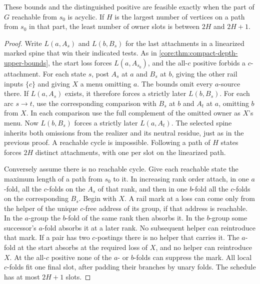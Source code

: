 \begin{theorem}
\label{core:thm:guard-transition-depth}
These bounds and the distinguished positive are feasible exactly when
the part of $G$ reachable from $s_0$ is acyclic. If $H$ is the largest
number of vertices on a path from $s_0$ in that part, the least number
of owner slots is between $2H$ and $2H+1$.
\end{theorem}
\begin{proof}
Write $L(a,A_s)$ and $L(b,B_s)$ for the last attachments in a
linearized marked spine that win their indicated tests. As in
\cref{core:thm:compact-depth-upper-bounds}, the start loss forces
$L(a,A_{s_0})$, and the all-$c$ positive forbids a $c$-attachment.
For each state $s$, post $A_s$ at $a$ and $B_s$ at $b$, giving
the other rail inputs $\{c\}$ and giving $X$ a menu omitting $a$.
The bounds omit every $a$-source there. If $L(a,A_s)$ exists, it
therefore forces a strictly later $L(b,B_s)$. For each arc $s\to t$,
use the corresponding comparison with $B_s$ at $b$ and $A_t$ at $a$,
omitting $b$ from $X$. In each comparison use the full complement
of the omitted owner as $X$'s menu. Now $L(b,B_s)$ forces a strictly later
$L(a,A_t)$. The selected spine inherits both omissions from the
realizer and its neutral residue, just as in the previous proof.
A reachable cycle is impossible. Following a path of $H$ states
forces $2H$ distinct attachments, with one per slot on the
linearized path.

Conversely assume there is no reachable cycle. Give each reachable
state the maximum length of a path from $s_0$ to it. In increasing
rank order attach, in one $a$-fold, all the $c$-folds on the $A_s$
of that rank, and then in one $b$-fold all the $c$-folds on the
corresponding $B_s$. Begin with $X$. A rail mark at a loss can come
only from the helper of the unique $c$-free address of its group,
if that address is reachable. In the $a$-group the $b$-fold of the
same rank then absorbs it. In the $b$-group some successor's $a$-fold
absorbs it at a later rank. No subsequent helper can reintroduce that
mark. If a pair has two $c$-postings there is no helper that carries
it. The $a$-fold at the start absorbs at the required loss of $X$,
and no helper can reintroduce $X$. At the all-$c$ positive none of
the $a$- or $b$-folds can suppress the mark. All local $c$-folds fit
one final slot, after padding their branches by unary folds. The
schedule has at most $2H+1$ slots.
\end{proof}

